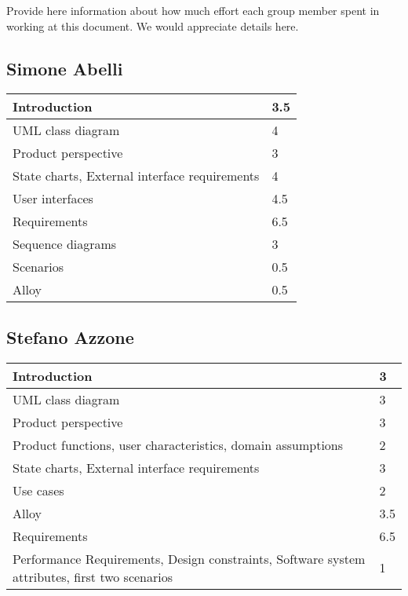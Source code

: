 Provide here information about how much effort each group member spent in working at this document. We would appreciate details here.\\

\subsection{Simone Abelli}
\begin{tabular} { | m{5cm} | m{1cm} | }
	\hline
	Introduction & 3.5\\
	\hline
	UML class diagram & 4\\
	\hline
	Product perspective & 3\\
	\hline
	State charts, External interface requirements & 4\\
	\hline
	User interfaces & 4.5\\
	\hline
	Requirements & 6.5\\
	\hline
	Sequence diagrams & 3\\
	\hline
	Scenarios & 0.5\\
	\hline
	Alloy & 0.5\\
	\hline
\end{tabular}

\subsection{Stefano Azzone}
\begin{tabular} { | m{5cm} | m{1cm} | }
	\hline
	Introduction & 3\\
	\hline
	UML class diagram & 3\\
	\hline
	Product perspective & 3\\
	\hline
	Product functions, user characteristics, domain assumptions & 2\\
	\hline
	State charts, External interface requirements & 3\\
	\hline
	Use cases & 2\\
	\hline
	Alloy & 3.5\\
	\hline
	Requirements & 6.5\\
	\hline
	Performance Requirements, Design constraints, Software system attributes, first two scenarios & 1\\
	\hline
\end{tabular}